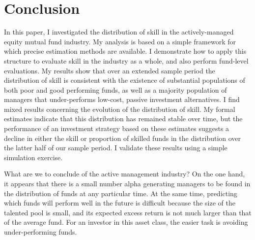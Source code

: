\section{Conclusion}
	In this paper, I investigated the distribution of skill in the actively-managed equity mutual fund industry. My analysis is based on a simple framework for which precise estimation methods are available. I demonstrate how to apply this structure to evaluate skill in the industry as a whole, and also perform fund-level evaluations. My results show that over an extended sample period the distribution of skill is consistent with the existence of substantial populations of both poor and good performing funds, as well as a majority population of managers that under-performs low-cost, passive investment alternatives. I find mixed results concerning the evolution of the distribution of skill. My formal estimates indicate that this distribution has remained stable over time, but the performance of an investment strategy based on these estimates suggests a decline in either the skill or proportion of skilled funds in the distribution over the latter half of our sample period. I validate these results using a simple simulation exercise.

	What are we to conclude of the active management industry? On the one hand, it appears that there is a small number alpha generating managers to be found in the distribution of funds at any particular time. At the same time, predicting which funds will perform well in the future is difficult because the size of the talented pool is small, and its expected excess return is not much larger than that of the average fund. For an investor in this asset class, the easier task is avoiding under-performing funds.
